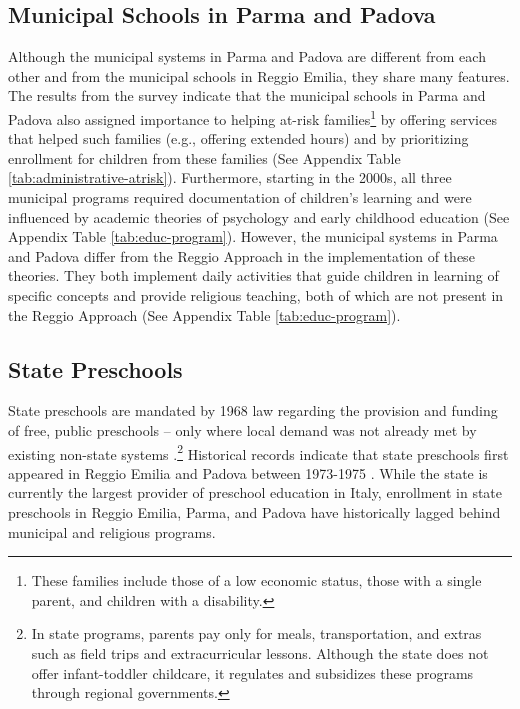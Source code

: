 \subsection{Municipal Schools in Parma and Padova}
Although the municipal systems in Parma and Padova are different from each other and from the municipal schools in Reggio Emilia, they share many features. The results from the survey indicate that the municipal schools in Parma and Padova also assigned importance to helping at-risk families\footnote{These families include those of a low economic status, those with a single parent, and children with a disability.} by offering services that helped such families (e.g., offering extended hours) and by prioritizing enrollment for children from these families (See Appendix Table \ref{tab:administrative-atrisk}). Furthermore, starting in the 2000s, all three municipal programs required documentation of children's learning and were influenced by academic theories of psychology and early childhood education (See Appendix Table \ref{tab:educ-program}). However, the municipal systems in Parma and Padova differ from the Reggio Approach in the implementation of these theories. They both implement daily activities that guide children in learning of specific concepts and provide religious teaching, both of which are not present in the Reggio Approach (See Appendix Table \ref{tab:educ-program}). 


\subsection{State Preschools}
State preschools are mandated by 1968 law regarding the provision and funding of free, public preschools -- only where local demand was not already met by existing non-state systems \citep{Hohnerlein_2009_Paradox-Public-Preschools}.\footnote{In state programs, parents pay only for meals, transportation, and extras such as field trips and extracurricular lessons. Although the state does not offer infant-toddler childcare, it regulates and subsidizes these programs through regional governments.}  Historical records indicate that state preschools first appeared in Reggio Emilia and Padova between 1973-1975 \citep{Padova-Admin-Data_1964-2011,Reggio-Admin-data_1966-2006,Reggio-Annual-Journals_1994-2011}. While the state is currently the largest provider of preschool education in Italy, enrollment in state preschools in Reggio Emilia, Parma, and Padova have historically lagged behind municipal and religious programs.

